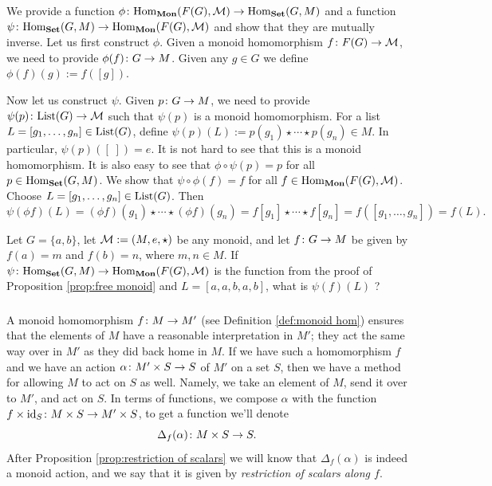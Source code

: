\begin{proofENG}
We provide a function $\phi\colon\textnormal{Hom}_{\bf Mon}(F(G),\mathcal{M})\rightarrow\textnormal{Hom}_{\bf Set}(G,M)$ and a function $\psi\colon\textnormal{Hom}_{\bf Set}(G,M)\rightarrow\textnormal{Hom}_{\bf Mon}(F(G),\mathcal{M})$ and show that they are mutually inverse. Let us first construct $\phi$. Given a monoid homomorphism $f\colon F(G)\rightarrow\mathcal{M}$, we need to provide $\phi(f)\colon G\rightarrow M$. Given any $g\in G$ we define $\phi(f)(g):=f([g]).$ 

Now let us construct $\psi$. Given $p\colon G\rightarrow M$, we need to provide $\psi(p)\colon\textnormal{List}(G)\rightarrow\mathcal{M}$ such that $\psi(p)$ is a monoid homomorphism. For a list $L=[g_1,\ldots,g_n]\in\textnormal{List}(G)$, define $\psi(p)(L):=p(g_1)\star\cdots\star p(g_n)\in M$. In particular, $\psi(p)([\;])=e$. It is not hard to see that this is a monoid homomorphism. It is also easy to see that $\phi\circ\psi(p)=p$ for all $p\in\textnormal{Hom}_{\bf Set}(G,M)$. We show that $\psi\circ\phi(f)=f$ for all $f\in\textnormal{Hom}_{\bf Mon}(F(G),\mathcal{M})$. Choose $L=[g_1,\ldots,g_n]\in\textnormal{List}(G)$. Then 
$$\psi(\phi f)(L)=(\phi f)(g_1)\star\cdots\star(\phi f)(g_n)=f[g_1]\star\cdots\star f[g_n]=f([g_1,\ldots,g_n])=f(L).$$
\end{proofENG}

\begin{proofRUS}
\end{proofRUS}

\begin{exerciseENG}
Let $G=\{a,b\}$, let $\mathcal{M}:=(M,e,\star)$ be any monoid, and let $f\colon G\rightarrow M$ be given by $f(a)=m$ and $f(b)=n$, where $m,n\in M$. If $\psi\colon\textnormal{Hom}_{\bf Set}(G,M)\rightarrow\textnormal{Hom}_{\bf Mon}(F(G),\mathcal{M})$ is the function from the proof of Proposition \ref{prop:free monoid} and $L=[a,a,b,a,b]$, what is $\psi(f)(L)$ ?
\end{exerciseENG}

\begin{exerciseRUS}
\end{exerciseRUS}


\subsubsection{}

\begin{blockENG}
A monoid homomorphism $f\colon M\rightarrow M'$ (see Definition \ref{def:monoid hom}) ensures that the elements of $M$ have a reasonable interpretation in $M'$; they act the same way over in $M'$ as they did back home in $M$. If we have such a homomorphism $f$ and we have an action $\alpha\colon M'\times S\rightarrow S$ of $M'$ on a set $S$, then we have a method for allowing $M$ to act on $S$ as well. Namely, we take an element of $M$, send it over to $M'$, and act on $S$. In terms of functions, we compose $\alpha$ with the function $f\times\textnormal{id}_S\colon M\times S\rightarrow M'\times S$, to get a function we'll denote $$\Delta_f(\alpha)\colon M\times S\rightarrow S.$$ After Proposition \ref{prop:restriction of scalars} we will know that $\Delta_f(\alpha)$ is indeed a monoid action, and we say that it is given by {\em restriction of scalars along $f$}.
\end{blockENG}

